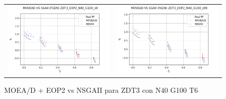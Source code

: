 \begin{figure}[H]
\begin{tabular}{c c}
    \includegraphics[scale=0.5]{figures/ZDT3_EOP2_N40_G100_T6/s9_comp.png} &
    \includegraphics[scale=0.5]{figures/ZDT3_EOP2_N40_G100_T6/s99_comp.png}\\
    \end{tabular}
    \caption{\centering MOEA/D + EOP2 vs NSGAII para ZDT3 con N40 G100 T6}
    \label{fig:13}
\end{figure}

